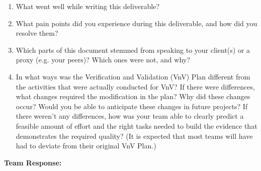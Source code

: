 \documentclass[12pt, titlepage]{article}
\begin{document}
\begin{enumerate}
  \item What went well while writing this deliverable?
  \item What pain points did you experience during this deliverable, and how
    did you resolve them?
  \item Which parts of this document stemmed from speaking to your client(s) or
  a proxy (e.g. your peers)? Which ones were not, and why?
  \item In what ways was the Verification and Validation (VnV) Plan different
  from the activities that were actually conducted for VnV?  If there were
  differences, what changes required the modification in the plan?  Why did
  these changes occur?  Would you be able to anticipate these changes in future
  projects?  If there weren't any differences, how was your team able to clearly
  predict a feasible amount of effort and the right tasks needed to build the
  evidence that demonstrates the required quality?  (It is expected that most
  teams will have had to deviate from their original VnV Plan.)
\end{enumerate}

{\bf{Team Response:}}
\end{document}
